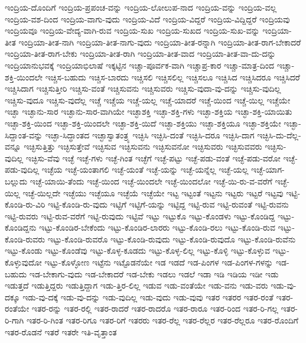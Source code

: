 {ಇಂದ್ರಿಯ-ದೊಂದಿಗೆ
ಇಂದ್ರಿಯ-ಪ್ರಪಂಚ-ವನ್ನು
ಇಂದ್ರಿಯ-ಲೋಲುಪ-ನಾದ
ಇಂದ್ರಿಯ-ವನ್ನು
ಇಂದ್ರಿಯ-ವಲ್ಲ
ಇಂದ್ರಿಯ-ವಶ-ದಿಂದ
ಇಂದ್ರಿಯ-ವಾಗು-ವುದು
ಇಂದ್ರಿಯ-ವಿದೆ
ಇಂದ್ರಿಯ-ವಿದ್ದರೆ
ಇಂದ್ರಿಯ-ವಿದ್ದಿದ್ದರೆ
ಇಂದ್ರಿಯವು
ಇಂದ್ರಿಯವೂ
ಇಂದ್ರಿಯ-ವೇದ್ಯ-ವಾಗಿ-ರುವ
ಇಂದ್ರಿಯ-ಸುಖ
ಇಂದ್ರಿಯ-ಸುಖದ
ಇಂದ್ರಿಯ-ಸುಖ-ವನ್ನು
ಇಂದ್ರಿಯಾ-ತೀತ
ಇಂದ್ರಿಯಾ-ತೀತ-ನಾಗಿ
ಇಂದ್ರಿಯಾ-ತೀತ-ನಾಗು-ವುದು
ಇಂದ್ರಿಯಾ-ತೀತ-ರನ್ನಾಗಿ
ಇಂದ್ರಿಯಾ-ತೀತ-ರಾಗ-ಬೇಕಾದರೆ
ಇಂದ್ರಿಯಾ-ತೀತ-ರಾಗ-ಬೇಕು
ಇಂದ್ರಿಯಾ-ತೀತ-ರಾಗಿ
ಇಂದ್ರಿಯಾ-ತೀತ-ವಾದ
ಇಂದ್ರಿಯಾ-ತೀತ-ವಾ-ದು-ದನ್ನು
ಇಂದ್ರಿಯಾನುಭವಕ್ಕೆ
ಇಂದ್ರಿಯಾಭಿಲಾಷೆ
ಇಕ್ಕಟ್ಟಿನ
ಇಚ್ಚಾ-ಪೂರ್ವಕ-ವಾಗಿ
ಇಚ್ಚಾಪ್ರ-ಕಾರ
ಇಚ್ಚಾ-ಮಾತ್ರ-ದಿಂದ
ಇಚ್ಚಾ-ಶಕ್ತಿ-ಯಿಂದಲೇ
ಇಚ್ಚಿಸ-ಬಹುದು
ಇಚ್ಚಿಸ-ಬಾರದು
ಇಚ್ಚಿಸಲಿ
ಇಚ್ಚಿಸಲಿಲ್ಲ
ಇಚ್ಚಿಸಲೂ
ಇಚ್ಚಿಸಿದ
ಇಚ್ಚಿಸಿದರೂ
ಇಚ್ಚಿಸಿದರೆ
ಇಚ್ಚಿಸಿದಾಗ
ಇಚ್ಚಿಸುತ್ತೀರಿ
ಇಚ್ಚಿಸು-ವಂತೆ
ಇಚ್ಚಿಸುವನು
ಇಚ್ಚಿಸುವರು
ಇಚ್ಚಿಸು-ವುದಾ-ವು-ದನ್ನು
ಇಚ್ಚಿಸು-ವುದಿಲ್ಲ
ಇಚ್ಚಿಸು-ವುದೂ
ಇಚ್ಚಿಸು-ವುದೆಲ್ಲ
ಇಚ್ಚೆ
ಇಚ್ಚೆಯ
ಇಚ್ಚೆ-ಯಲ್ಲ
ಇಚ್ಚೆ-ಯಾದರೆ
ಇಚ್ಚೆ-ಯಿಂದ
ಇಚ್ಚೆ-ಯಿಲ್ಲ
ಇಚ್ಚೆಯೇ
ಇಚ್ಛಾ
ಇಚ್ಛಾನು-ಸಾರ
ಇಚ್ಛಾನು-ಸಾರ-ವಾಗಿಯೇ
ಇಚ್ಛಾಶಕ್ತಿ
ಇಚ್ಛಾ-ಶಕ್ತಿ-ಗಳು
ಇಚ್ಛಾ-ಶಕ್ತಿಯ
ಇಚ್ಛಾ-ಶಕ್ತಿ-ಯಾಯಿತು
ಇಚ್ಛಾ-ಶಕ್ತಿ-ಯಿಂದ
ಇಚ್ಛಾ-ಶಕ್ತಿ-ಯಿಂದಲೇ
ಇಚ್ಛಾ-ಶಕ್ತಿ-ಯಿದೆ
ಇಚ್ಛಾ-ಶಕ್ತಿಯು
ಇಚ್ಛಾ-ಶಕ್ತಿಯೂ
ಇಚ್ಛಾ-ಶಕ್ತಿಯೇ
ಇಚ್ಛಾ-ಸಿದ್ದಾಂತ-ವನ್ನು
ಇಚ್ಛಾ-ಸಿದ್ಧಾಂತದ
ಇಚ್ಛಾಸ್ವಾತಂತ್ರ್ಯ
ಇಚ್ಛಿಸಿ
ಇಚ್ಛಿಸಿ-ದಂತೆ
ಇಚ್ಛಿಸಿ-ದರೂ
ಇಚ್ಛಿಸಿ-ದಾಗ
ಇಚ್ಛಿಸಿ-ದು-ದೆಲ್ಲ-ವನ್ನೂ
ಇಚ್ಛಿಸುತ್ತಿತ್ತು
ಇಚ್ಛಿಸುತ್ತೇವೆ
ಇಚ್ಛಿಸುವ
ಇಚ್ಛಿಸುವನು
ಇಚ್ಛಿಸುವನೋ
ಇಚ್ಛಿಸುವರು
ಇಚ್ಛಿಸುವವರು
ಇಚ್ಛಿಸು-ವುದಿಲ್ಲ
ಇಚ್ಛಿಸು-ವೆವು
ಇಚ್ಛೆ
ಇಚ್ಛೆ-ಗಳು
ಇಚ್ಛೆ-ಗಿಂತ
ಇಚ್ಛೆಗೆ
ಇಚ್ಛೆ-ಪಟ್ಟು
ಇಚ್ಛೆ-ಪಡು-ವಂತೆ
ಇಚ್ಛೆ-ಪಡು-ವರೋ
ಇಚ್ಛೆ-ಪಡು-ವುದಿಲ್ಲ
ಇಚ್ಛೆಯ
ಇಚ್ಛೆ-ಯಂತಾಗಲಿ
ಇಚ್ಛೆ-ಯಂತೆ
ಇಚ್ಛೆ-ಯನ್ನು
ಇಚ್ಛೆ-ಯನ್ನೆಲ್ಲ
ಇಚ್ಛೆ-ಯಲ್ಲ
ಇಚ್ಛೆ-ಯಾಗ-ಬಲ್ಲುದು
ಇಚ್ಛೆ-ಯಾಯಿ-ತೆಂದು
ಇಚ್ಛೆ-ಯಿಂದ
ಇಚ್ಛೆ-ಯಿಂದಲೇ
ಇಚ್ಛೆ-ಯಿಂದಲೋ
ಇಚ್ಛೆ-ಯಿ-ರು-ವ-ವರೆಗೆ
ಇಚ್ಛೆ-ಯಿಲ್ಲ
ಇಚ್ಛೆ-ಯಿಲ್ಲದೇ
ಇಚ್ಛೆಯು
ಇಚ್ಛೆಯೂ
ಇಚ್ಛೆಯೆ
ಇಚ್ಛೆಯೇ
ಇಟ್ಟ
ಇಟ್ಟಂತೆ
ಇಟ್ಟನು
ಇಟ್ಟರು
ಇಟ್ಟರೆ
ಇಟ್ಟವು
ಇಟ್ಟಿ-ಕೊಂಡಿ-ರು-ವಿರಿ
ಇಟ್ಟಿ-ಕೊಂಡಿ-ರು-ವುದು
ಇಟ್ಟಿಗೆ
ಇಟ್ಟಿಗೆ-ಯನ್ನು
ಇಟ್ಟಿದ್ದ
ಇಟ್ಟಿ-ರುವ
ಇಟ್ಟಿ-ರುವಂತೆ
ಇಟ್ಟಿ-ರುವನು
ಇಟ್ಟಿ-ರುವರು
ಇಟ್ಟಿ-ರುವ-ವರೆಗೆ
ಇಟ್ಟಿ-ರುವುದು
ಇಟ್ಟಿವೆ
ಇಟ್ಟು
ಇಟ್ಟುಕೊ
ಇಟ್ಟು-ಕೊಂಡಳು
ಇಟ್ಟು-ಕೊಂಡಿದ್ದ
ಇಟ್ಟು-ಕೊಂಡಿದ್ದನು
ಇಟ್ಟು-ಕೊಂಡಿರ-ಬೇಕೆಂದು
ಇಟ್ಟು-ಕೊಂಡಿರ-ಲಾರರು
ಇಟ್ಟು-ಕೊಂಡಿ-ರಲು
ಇಟ್ಟು-ಕೊಂಡಿ-ರುವ
ಇಟ್ಟು-ಕೊಂಡಿ-ರುವರು
ಇಟ್ಟು-ಕೊಂಡಿ-ರುವರೊ
ಇಟ್ಟು-ಕೊಂಡಿ-ರುವುದು
ಇಟ್ಟು-ಕೊಂಡಿ-ರುವುದೊ
ಇಟ್ಟು-ಕೊಂಡಿ-ರುವೆನು
ಇಟ್ಟು-ಕೊಂಡು
ಇಟ್ಟು-ಕೊಂಡೆವು
ಇಟ್ಟು-ಕೊಳ್ಳ-ಕೂಡದು
ಇಟ್ಟು-ಕೊಳ್ಳ-ಲಿಲ್ಲ
ಇಟ್ಟು-ಕೊಳ್ಳಿ
ಇಟ್ಟು-ಕೊಳ್ಳುವ
ಇಟ್ಟು-ಕೊಳ್ಳುವುದೋ
ಇಟ್ಟು-ಕೊಳ್ಳೋಣ
ಇಟ್ಟೆನು
ಇಟ್ಟೊಡನೆಯೇ
ಇಡ
ಇಡದೆ
ಇಡ-ಪಿಂಗಳ
ಇಡ-ಪಿಂಗಳ-ಗಳನ್ನು
ಇಡ-ಬಹುದು
ಇಡ-ಬೇಕಾಗು-ವುದು
ಇಡ-ಬೇಕಾದರೆ
ಇಡ-ಬೇಕು
ಇಡಲು
ಇಡಲೆ
ಇಡಾ
ಇಡಿ
ಇಡಿಯ
ಇಡೀ
ಇಡು
ಇಡುತ್ತದೆ
ಇಡುತ್ತಿದ್ದರು
ಇಡುತ್ತಿದ್ದಾಗ
ಇಡು-ತ್ತಿರ-ಲಿಲ್ಲ
ಇಡುವ
ಇಡು-ವಂತೆಯೇ
ಇಡು-ವನು
ಇಡು-ವರು
ಇಡು-ವು-ದಕ್ಕೂ
ಇಡು-ವು-ದಕ್ಕೆ
ಇಡು-ವು-ದನ್ನು
ಇಡು-ವುದಿಲ್ಲ
ಇಡು-ವುದು
ಇಡು-ವುವು
ಇತರ
ಇತರರ
ಇತರ-ರಂತೆ
ಇತರ-ರಂತೆಯೇ
ಇತರ-ರನ್ನು
ಇತರ-ರಲ್ಲಿ
ಇತರ-ರಾದರೆ
ಇತರ-ರಾದರೊ
ಇತರ-ರಾರೂ
ಇತರ-ರಿಂದ
ಇತರ-ರಿ-ಗಲ್ಲ
ಇತರ-ರಿ-ಗಾಗಿ
ಇತರ-ರಿ-ಗಿಂತ
ಇತರ-ರಿಗೂ
ಇತರ-ರಿಗೆ
ಇತರರು
ಇತರ-ರೆಲ್ಲ
ಇತರ-ರೆಲ್ಲರ
ಇತರ-ರೆಲ್ಲರೂ
ಇತರ-ರೊಂದಿಗೆ
ಇತರ-ರೊಡನೆ
ಇತರೆ
ಇತರೇ
ಇತಿ-ವೃತ್ತಾಂತ
}
